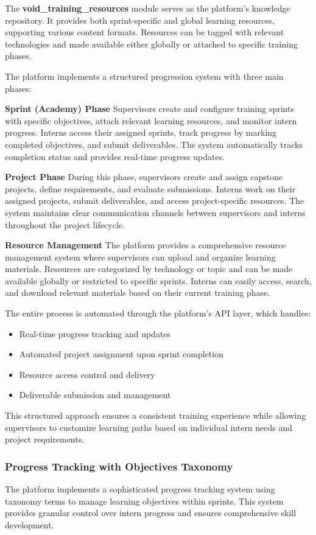 The \textbf{void\_training\_resources} module serves as the platform's knowledge repository. It provides both sprint-specific and global learning resources, supporting various content formats. Resources can be tagged with relevant technologies and made available either globally or attached to specific training phases.

The platform implements a structured progression system with three main phases:

\textbf{Sprint (Academy) Phase}
Supervisors create and configure training sprints with specific objectives, attach relevant learning resources, and monitor intern progress. Interns access their assigned sprints, track progress by marking completed objectives, and submit deliverables. The system automatically tracks completion status and provides real-time progress updates.

\textbf{Project Phase}
During this phase, supervisors create and assign capstone projects, define requirements, and evaluate submissions. Interns work on their assigned projects, submit deliverables, and access project-specific resources. The system maintains clear communication channels between supervisors and interns throughout the project lifecycle.

\textbf{Resource Management}
The platform provides a comprehensive resource management system where supervisors can upload and organize learning materials. Resources are categorized by technology or topic and can be made available globally or restricted to specific sprints. Interns can easily access, search, and download relevant materials based on their current training phase.

The entire process is automated through the platform's API layer, which handles:
\begin{itemize}
    \item Real-time progress tracking and updates
    \item Automated project assignment upon sprint completion
    \item Resource access control and delivery
    \item Deliverable submission and management
\end{itemize}

This structured approach ensures a consistent training experience while allowing supervisors to customize learning paths based on individual intern needs and project requirements.

\subsubsection{Progress Tracking with Objectives Taxonomy}
The platform implements a sophisticated progress tracking system using taxonomy terms to manage learning objectives within sprints. This system provides granular control over intern progress and ensures comprehensive skill development.

